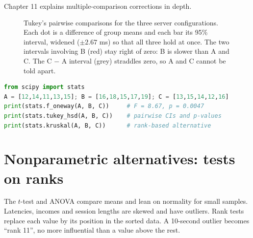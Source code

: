 Chapter 11 explains multiple-comparison corrections in depth.

\begin{figure}[H]
\centering
{}
\caption{Tukey's pairwise comparisons for the three server configurations.
Each dot is a difference of group means and each bar its 95\% interval,
widened ($\pm 2.67$ ms) so that all three hold at once. The two intervals
involving B (red) stay right of zero: B is slower than A and C. The C $-$ A
interval (grey) straddles zero, so A and C cannot be told apart.}
\label{fig:cg-tukey}
\end{figure}

\begin{lstlisting}[language=Python]
from scipy import stats
A = [12,14,11,13,15]; B = [16,18,15,17,19]; C = [13,15,14,12,16]
print(stats.f_oneway(A, B, C))     # F = 8.67, p = 0.0047
print(stats.tukey_hsd(A, B, C))    # pairwise CIs and p-values
print(stats.kruskal(A, B, C))      # rank-based alternative
\end{lstlisting}

\section{Nonparametric alternatives: tests on ranks}
\label{sec:cg-nonpar}

The $t$-test and ANOVA compare means and lean on normality for small samples.
Latencies, incomes and session lengths are skewed and have outliers. Rank
tests replace each value by its position in the sorted data. A 10-second
outlier becomes ``rank 11'', no more influential than a value above the
rest.

